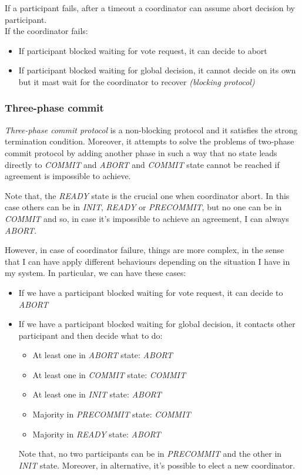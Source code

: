 If a participant fails, after a timeout a coordinator can assume abort decision by participant.\\
If the coordinator fails:
\begin{itemize}
\itemsep1pt\parskip0pt
\item
  If participant blocked waiting for vote request, it can decide to
  abort
\item
  If participant blocked waiting for global decision, it cannot decide
  on its own but it mast wait for the coordinator to recover \textit{(blocking
  protocol)}
\end{itemize}

\subsubsection{Three-phase commit}\label{three-phase-commit}
\textit{Three-phase commit protocol} is a non-blocking protocol and it satisfies the strong termination condition. Moreover, it attempts to solve the problems of two-phase commit protocol by adding another phase in such a way that no state leads directly to \textit{COMMIT} and \textit{ABORT} and \textit{COMMIT} state cannot be reached if agreement is impossible to achieve.

Note that, the \textit{READY} state is the crucial one when coordinator abort. In this case others can be in \textit{INIT}, \textit{READY} or \textit{PRECOMMIT}, but no one can be in \textit{COMMIT} and so, in case it's impossible to achieve an agreement, I can always \textit{ABORT}.

However, in case of coordinator failure, things are more complex, in the sense that I can have apply different behaviours depending on the situation I have in my system. In particular, we can have these cases:

\begin{itemize}
    \item If we have a participant blocked waiting for vote request, it can decide to \textit{ABORT}
    \item If we have a participant blocked waiting for global decision, it contacts other participant and then decide what to do:
        \begin{itemize}
            \item At least one in \textit{ABORT} state: \textit{ABORT}
            \item At least one in \textit{COMMIT} state: \textit{COMMIT}
            \item At least one in \textit{INIT} state: \textit{ABORT}
            \item Majority in \textit{PRECOMMIT} state: \textit{COMMIT}
            \item Majority in \textit{READY} state: \textit{ABORT}
        \end{itemize}
        
        Note that, no two participants can be in \textit{PRECOMMIT} and the other in \textit{INIT} state. Moreover, in alternative, it's possible to elect a new coordinator.
\end{itemize}

